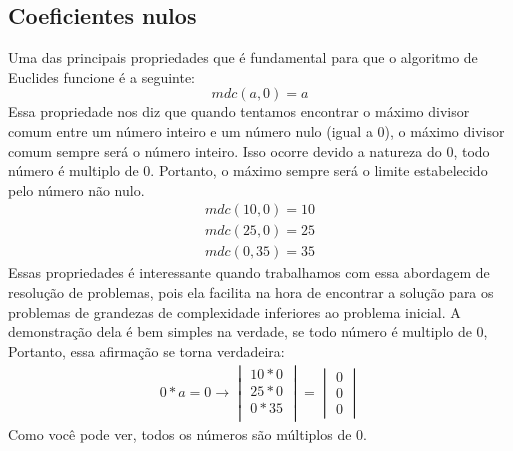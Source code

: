 \documentclass{article}
\begin{document}
    \subsection{Coeficientes nulos}
    Uma das principais propriedades que é fundamental para que o algoritmo de Euclides funcione é a seguinte:
    \begin{equation}
        mdc(a, 0) = a
    \end{equation}
    Essa propriedade nos diz que quando tentamos encontrar o máximo divisor comum entre um número inteiro e um número nulo (igual a 0), o máximo divisor comum sempre será o número inteiro. Isso ocorre devido a natureza do 0, todo número é multiplo de 0. Portanto, o máximo sempre será o limite estabelecido pelo número não nulo.
    \begin{equation}
        \begin{split}
            mdc(10, 0) = 10\\
            mdc(25, 0) = 25\\
            mdc(0, 35) = 35
        \end{split}
    \end{equation}
    Essas propriedades é interessante quando trabalhamos com essa abordagem de resolução de problemas, pois ela facilita na hora de encontrar a solução para os problemas de grandezas de complexidade inferiores ao problema inicial. A demonstração dela é bem simples na verdade, se todo número é multiplo de 0, Portanto, essa afirmação se torna verdadeira:
    \begin{equation}
        \begin{split}
            0 * a = 0 \to \begin{vmatrix}
                10*0\\
                25*0\\
                0*35\\
                \end{vmatrix} = \begin{vmatrix}
                0\\
                0\\
                0
            \end{vmatrix}
        \end{split}
    \end{equation}
    Como você pode ver, todos os números são múltiplos de 0.
\end{document}
